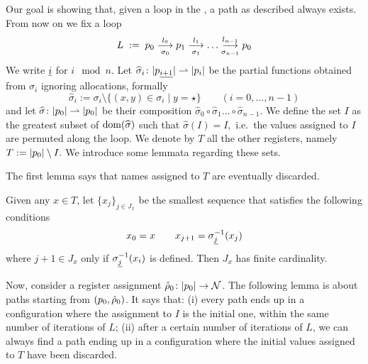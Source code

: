 Our goal is showing that, given a loop in the \hdma{}, a path as described always exists. From now on we fix a loop
\[
	L \;:=\; p_0 \overset{l_0}{\underset{\sigma_0}{\longrightarrow}} p_1 \overset{l_1}{\underset{\sigma_1}{\longrightarrow}} \dots \overset{l_{n-1}}{\underset{\sigma_{n-1}}{\longrightarrow}} p_0
\]
We write ${\underline{i}}$ for $i \mod n$. Let $\widehat{\sigma}_i \colon |p_{\underline{i+1}}| \rightharpoonup |p_i|$ be the partial functions obtained from $\sigma_i$ ignoring allocations, formally
\[
	\widehat{\sigma}_i := \sigma_i \setminus \{ (x,y) \in \sigma_i \mid y = \star \} 
	\qquad (i=0,\dots,n-1)
\]
and let $\widehat{\sigma} \colon |p_0| \rightharpoonup |p_0|$ be their composition $\widehat{\sigma}_0 \circ \widehat{\sigma}_1 \dots \circ \widehat{\sigma}_{n-1}$. We define the set $I$ as the greatest subset of $\operatorname{dom}(\widehat{\sigma})$ such that
$
	\widehat{\sigma}(I) = I,
$
i.e.\ the values assigned to $I$ are permuted along the loop. We denote by $T$ all the other registers, namely 
$
	T := |p_0| \setminus I .
$
%
We introduce some lemmata regarding these sets.


The first lemma says that names assigned to $T$ are eventually discarded.
%
\begin{lemma}
\label{lem:rho-forget}
Given any $x \in T$, let $\{x_j\}_{j \in J_x}$ be the smallest sequence that satisfies the following conditions
\[
	x_0 = x \qquad
	x_{j+1} = \sigma_{{\underline{j}}}^{-1}(x_j)
\]
where $j+1 \in J_x$ only if $\sigma_{{\underline{j}}}^{-1}(x_i)$ is defined. Then $J_x$ has finite cardinality.

\end{lemma}

%
Now, consider a register assignment $\hat{\rho}_0 \colon |p_0| \to \mathcal{N}$. The following lemma is about paths  starting from $(p_0,\hat{\rho}_0)$.
It says that: (i) every path ends up in a configuration where the assignment to $I$ is the initial one, within the same number of iterations of $L$; (ii) after a certain number of iterations of $L$, we can always find a path ending up in a configuration where the initial values assigned to $T$ have been discarded.



